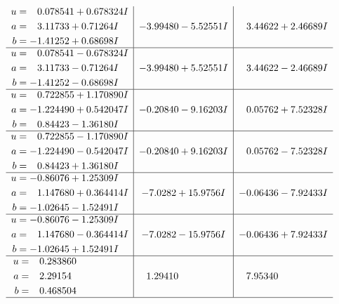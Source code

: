 \documentclass[1p]{elsarticle_modified}
\theoremstyle{definition}
\begin{document}
$$\begin{array}{c|c|c}
\begin{aligned}
u &= \phantom{-}0.078541 + 0.678324 I \\
a &= \phantom{-}3.11733 + 0.71264 I \\
b &= -1.41252 + 0.68698 I\end{aligned}
 & -3.99480 - 5.52551 I & \phantom{-}3.44622 + 2.46689 I \\ \hline\begin{aligned}
u &= \phantom{-}0.078541 - 0.678324 I \\
a &= \phantom{-}3.11733 - 0.71264 I \\
b &= -1.41252 - 0.68698 I\end{aligned}
 & -3.99480 + 5.52551 I & \phantom{-}3.44622 - 2.46689 I \\ \hline\begin{aligned}
u &= \phantom{-}0.722855 + 1.170890 I \\
a &= -1.224490 + 0.542047 I \\
b &= \phantom{-}0.84423 - 1.36180 I\end{aligned}
 & -0.20840 - 9.16203 I & \phantom{-}0.05762 + 7.52328 I \\ \hline\begin{aligned}
u &= \phantom{-}0.722855 - 1.170890 I \\
a &= -1.224490 - 0.542047 I \\
b &= \phantom{-}0.84423 + 1.36180 I\end{aligned}
 & -0.20840 + 9.16203 I & \phantom{-}0.05762 - 7.52328 I \\ \hline\begin{aligned}
u &= -0.86076 + 1.25309 I \\
a &= \phantom{-}1.147680 + 0.364414 I \\
b &= -1.02645 - 1.52491 I\end{aligned}
 & -7.0282 + 15.9756 I & -0.06436 - 7.92433 I \\ \hline\begin{aligned}
u &= -0.86076 - 1.25309 I \\
a &= \phantom{-}1.147680 - 0.364414 I \\
b &= -1.02645 + 1.52491 I\end{aligned}
 & -7.0282 - 15.9756 I & -0.06436 + 7.92433 I \\ \hline\begin{aligned}
u &= \phantom{-}0.283860\phantom{ +0.000000I} \\
a &= \phantom{-}2.29154\phantom{ +0.000000I} \\
b &= \phantom{-}0.468504\phantom{ +0.000000I}\end{aligned}
 & \phantom{-}1.29410\phantom{ +0.000000I} & \phantom{-}7.95340\phantom{ +0.000000I}\\
 \hline 
 \end{array}$$\newpage\newpage\renewcommand{\arraystretch}{1}
\end{document}
